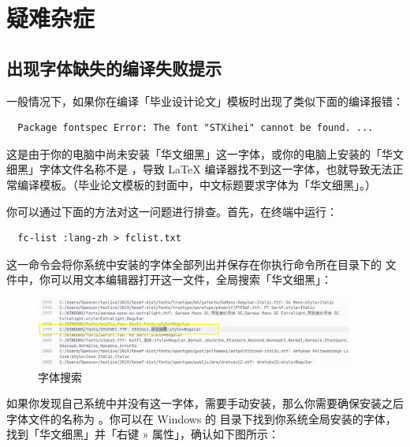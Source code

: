 \section{疑难杂症}

\subsection{出现字体缺失的编译失败提示}

一般情况下，如果你在编译「毕业设计论文」模板时出现了类似下面的编译报错：

\begin{verbatim}
  Package fontspec Error: The font "STXihei" cannot be found. ...
\end{verbatim}

这是由于你的电脑中尚未安装「华文细黑」这一字体，或你的电脑上安装的「华文细黑」字体文件名称不是 ，导致 LaTeX 编译器找不到这一字体，也就导致无法正常编译模板。（毕业论文模板的封面中，中文标题要求字体为「华文细黑」。）

你可以通过下面的方法对这一问题进行排查。首先，在终端中运行：

\begin{verbatim}
  fc-list :lang-zh > fclist.txt
\end{verbatim}

这一命令会将你系统中安装的字体全部列出并保存在你执行命令所在目录下的  文件中，你可以用文本编辑器打开这一文件，全局搜索「华文细黑」：

\begin{figure}[H]
  \flushright
  \includegraphics[width=0.93\textwidth]{images/search_font.png}
  \caption{字体搜索}
  \label{search_font}
\end{figure}

如果你发现自己系统中并没有这一字体，需要手动安装，那么你需要确保安装之后字体文件的名称为 。你可以在 Windows 的  目录下找到你系统全局安装的字体，找到「华文细黑」并「右键 » 属性」，确认如下图所示：

